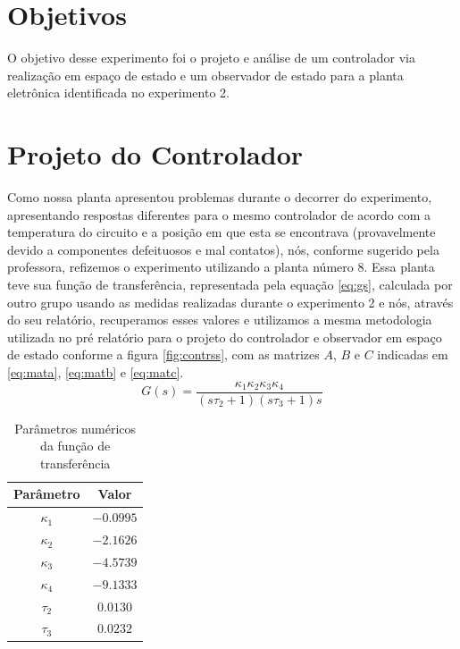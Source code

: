 \documentclass{article}
\begin{document}


\onehalfspacing
\section{Objetivos} 
O objetivo desse experimento foi o projeto e análise de um controlador via realização em espaço de estado e um observador de estado para a planta eletrônica identificada no experimento 2\cite{bb:lab2}. 
	
\section{Projeto do Controlador}
Como nossa planta apresentou problemas durante o decorrer do experimento, apresentando respostas diferentes para o mesmo controlador de acordo com a temperatura do circuito e a posição em que esta se encontrava (provavelmente devido a componentes defeituosos e mal contatos), nós, conforme sugerido pela professora, refizemos o experimento utilizando a planta número 8.
Essa planta teve sua função de transferência, representada pela equação \ref{eq:gs}, calculada por outro grupo usando as medidas realizadas durante o experimento 2 e nós, através do seu relatório\cite{bb:lab2gui}, recuperamos esses valores e utilizamos a mesma metodologia utilizada no pré relatório \cite{bb:prelab6} para o projeto do controlador e observador em espaço de estado conforme a figura \ref{fig:contrss}, com as matrizes $A$, $B$ e $C$ indicadas em \ref{eq:mata}, \ref{eq:matb} e \ref{eq:matc}.\\

\begin{equation}
\label{eq:gs}
G(s) = \frac{\kappa_1\kappa_2\kappa_3\kappa_4}{(s\tau_2 + 1)(s\tau_3 + 1)s}
\end{equation}

\begin{table}[H]
	\centering
	\caption{Parâmetros numéricos da função de transferência}
	\label{tab:valores}
	\begin{tabular}{|c|c|}
		\hline Parâmetro & Valor \\ 
		\hline $\kappa_1$ & $-0.0995$\\ 
		\hline $\kappa_2$ & $-2.1626$\\ 
		\hline $\kappa_3$ & $-4.5739$\\ 
		\hline $\kappa_4$ & $-9.1333$\\ 
		\hline $\tau_2$ & $0.0130$\\ 
		\hline $\tau_3$ & $0.0232$ \\ 	
		\hline 
	\end{tabular} 
\end{table}
\end{document}
